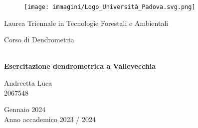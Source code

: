 \begin{figure}[H]
    \texttt{[image: immagini/Logo\_Università\_Padova.svg.png]}
\end{figure}
\vspace{0.5cm}
\begin{center}
{\Large
    Laurea Triennale in Tecnologie Forestali e Ambientali
    
    Corso di Dendrometria} \\ 
    \vspace{1 cm}
    {\huge \textbf{Esercitazione dendrometrica a Vallevecchia} }

\vspace{0.75 cm}

\normalsize
\end{center}
{\Large \begin{center}
Andreetta Luca \\
2067548
\end{center}
\vspace{0.5 cm}

\thispagestyle{empty}
\begin{center}
	Gennaio 2024 \\
	Anno accademico 2023 / 2024
\end{center}
}
\newpage